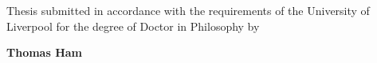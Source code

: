 \begin{center}
\begin{minipage}{1\linewidth}
		{\large Thesis submitted in accordance with the requirements of the University of Liverpool for the degree of Doctor in Philosophy by} \par
		\vspace{1cm}
		\Large \textbf{Thomas Ham} \par
		\vspace{1cm}
		\vspace{1cm}
		{\Large \monthyeardate}
	\end{minipage}
\end{center}
\vfill
\clearpage